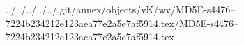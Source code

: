 ../../../../../.git/annex/objects/vK/wv/MD5E-s4476--7224b234212e123aea77e2a5e7af5914.tex/MD5E-s4476--7224b234212e123aea77e2a5e7af5914.tex